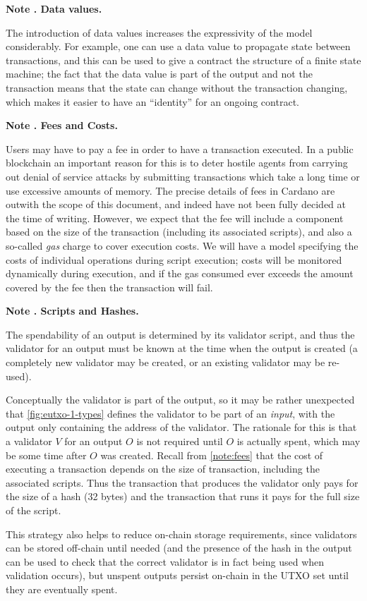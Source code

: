 \documentclass[a4paper]{article}
\newcounter{note}
\newcommand{\note}[1]{
  \bigskip
  \refstepcounter{note}
  \noindent\textbf{Note \thenote. #1}
}
\begin{document}
\note{Data values.}
\label{note:data-values}
The introduction of data values
increases the expressivity of the model considerably. For example,
one can use a data value to propagate state between
transactions, and this can be used to give a contract the structure
of a finite state machine; the fact that the data value is part
of the output and not the transaction means that the state can
change without the transaction changing, which makes it easier to
have an ``identity'' for an ongoing contract.

\note{Fees and Costs.}
\label{note:fees}
Users may have to pay a fee in order to have a transaction executed.
In a public blockchain an important reason for this is to deter
hostile agents from carrying out denial of service attacks by
submitting transactions which take a long time or use excessive
amounts of memory.  The precise details of fees in Cardano are outwith
the scope of this document, and indeed have not been fully decided at
the time of writing. However, we expect that the fee will include a
component based on the size of the transaction (including its
associated scripts), and also a so-called \textit{gas} charge to cover
execution costs.  We will have a model specifying the costs of
individual operations during script execution; costs will be monitored
dynamically during execution, and if the gas consumed ever exceeds the
amount covered by the fee then the transaction will fail.

\note{Scripts and Hashes.}
\label{note:scripts} The spendability of an output is determined by
its validator script, and thus the validator for an output must be
known at the time when the output is created (a completely new validator
may be created, or an existing validator may be re-used).

Conceptually the validator is part of the output, so it may be rather
unexpected that \cref{fig:eutxo-1-types} defines the validator
to be part of an \textit{input}, with the output only containing the
address of the validator.  The rationale for this is that a validator
$V$ for an output $O$ is not required until $O$ is actually spent,
which may be some time after $O$ was created. Recall from
\cref{note:fees} that the cost of executing a transaction depends
on the size of transaction, including the associated scripts.  Thus
the transaction that produces the validator only pays for the size of
a hash (32 bytes) and the transaction that runs it pays for the full
size of the script.

This strategy also helps to reduce on-chain
storage requirements, since validators can be stored off-chain until
needed (and the presence of the hash in the output can be used to
check that the correct validator is in fact being used when validation
occurs), but unspent outputs persist on-chain in the UTXO set until
they are eventually spent.
\end{document}
